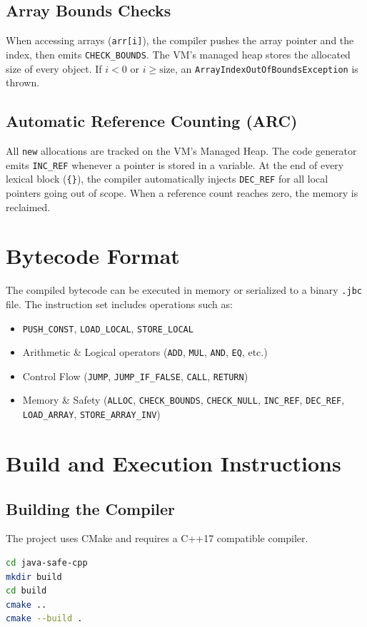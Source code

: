\documentclass[12pt, a4paper]{article}
\begin{document}
\subsection{Array Bounds Checks}
When accessing arrays (\texttt{arr[i]}), the compiler pushes the array pointer and the index, then emits \texttt{CHECK\_BOUNDS}. The VM's managed heap stores the allocated size of every object. If $i < 0$ or $i \ge \text{size}$, an \texttt{ArrayIndexOutOfBoundsException} is thrown.

\subsection{Automatic Reference Counting (ARC)}
All \texttt{new} allocations are tracked on the VM's Managed Heap. The code generator emits \texttt{INC\_REF} whenever a pointer is stored in a variable. At the end of every lexical block (\texttt{\{\}}), the compiler automatically injects \texttt{DEC\_REF} for all local pointers going out of scope. When a reference count reaches zero, the memory is reclaimed.

\section{Bytecode Format}
The compiled bytecode can be executed in memory or serialized to a binary \texttt{.jbc} file. The instruction set includes operations such as:
\begin{itemize}
    \item \texttt{PUSH\_CONST}, \texttt{LOAD\_LOCAL}, \texttt{STORE\_LOCAL}
    \item Arithmetic \& Logical operators (\texttt{ADD}, \texttt{MUL}, \texttt{AND}, \texttt{EQ}, etc.)
    \item Control Flow (\texttt{JUMP}, \texttt{JUMP\_IF\_FALSE}, \texttt{CALL}, \texttt{RETURN})
    \item Memory \& Safety (\texttt{ALLOC}, \texttt{CHECK\_BOUNDS}, \texttt{CHECK\_NULL}, \texttt{INC\_REF}, \texttt{DEC\_REF}, \texttt{LOAD\_ARRAY}, \texttt{STORE\_ARRAY\_INV})
\end{itemize}

\section{Build and Execution Instructions}

\subsection{Building the Compiler}
The project uses CMake and requires a C++17 compatible compiler.
\begin{lstlisting}[language=bash]
cd java-safe-cpp
mkdir build
cd build
cmake ..
cmake --build .
\end{lstlisting}
\end{document}
